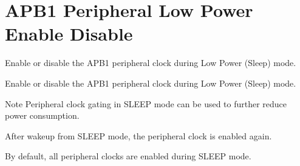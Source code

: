\hypertarget{group___r_c_c_ex___a_p_b1___low_power___enable___disable}{}\section{A\+P\+B1 Peripheral Low Power Enable Disable}
\label{group___r_c_c_ex___a_p_b1___low_power___enable___disable}


Enable or disable the A\+P\+B1 peripheral clock during Low Power (Sleep) mode.  


Enable or disable the A\+P\+B1 peripheral clock during Low Power (Sleep) mode. 

\begin{DoxyNote}{Note}
Peripheral clock gating in S\+L\+E\+EP mode can be used to further reduce power consumption. 

After wakeup from S\+L\+E\+EP mode, the peripheral clock is enabled again. 

By default, all peripheral clocks are enabled during S\+L\+E\+EP mode. 
\end{DoxyNote}
